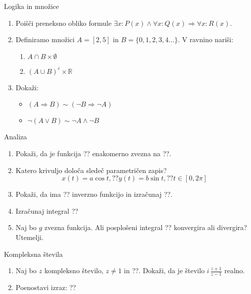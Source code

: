 \begin{frame}{Logika in množice}
	\begin{enumerate}
		\item
		Poišči preneksno obliko formule $\exists x:P(x)\land \forall x:Q(x)\Rightarrow \forall x: R(x)$.
		\item 
		Definiramo množici $A=[2,5]$ in $B=\{0,1,2,3,4\dots\}$.
		V ravnino nariši:
		\begin{enumerate}
		   \item $A \cap B \times \emptyset$
		   \item $(A \cup B)^c \times \mathbb{R} $
		\end{enumerate}
		\item
		Dokaži:
		\begin{itemize}
			\item $(A \Rightarrow B) \sim (\neg B \Rightarrow \neg A)$
			\item $\neg (A \lor B) \sim \neg A \land \neg B$
		\end{itemize}
	\end{enumerate}
\end{frame}

\begin{frame}{Analiza}
	\begin{enumerate}
		\item
		Pokaži, da je funkcija ?? enakomerno zvezna na ??.
		\item 
		Katero krivuljo določa sledeč parametričen zapis?
		$$
		   x(t) = a \cos t, ?? %
		   y(t) = b \sin t, ?? %
		   t \in [0, 2 \pi]
		$$ 
		\item
		Pokaži, da ima ?? inverzno funkcijo in izračunaj ??.
		
		\item
		Izračunaj integral 
		??
		\item 
		Naj bo $g$ zvezna funkcija. Ali posplošeni integral 
		??
		konvergira ali divergira? Utemelji.
	\end{enumerate}
\end{frame}

\begin{frame}{Kompleksna števila}
	\begin{enumerate}
		\item
		Naj bo $z$ kompleksno število, $z \ne 1$ in ??.
		Dokaži, da je število \( i \, \frac{z+1}{z-1} \) realno.
		\item
		Poenostavi izraz:
		??
	\end{enumerate}
\end{frame}